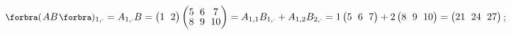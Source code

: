 $\BigPar{AB}{_{1,\cdot}}=A_{1,\cdot}B=\begin{pmatrix} 1 &\hspace{-4pt} 2\end{pmatrix}\begin{pmatrix} 5 &\hspace{-4pt} 6 &\hspace{-4pt} 7 \\[-2pt] 8 &\hspace{-4pt} 9 &\hspace{-4pt} 10\end{pmatrix}=A_{1,1}B_{1,\cdot}+A_{1,2}B_{2,\cdot}=1\begin{pmatrix} 5 &\hspace{-4pt} 6 &\hspace{-4pt} 7\end{pmatrix}+2\begin{pmatrix}8 &\hspace{-4pt} 9 &\hspace{-4pt} 10\end{pmatrix}=\begin{pmatrix} 21 &\hspace{-4pt} 24 &\hspace{-4pt} 27\end{pmatrix}$;\par\vspace{6pt}
